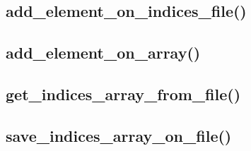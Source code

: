 \documentclass[12pt, a4paper]{article}
\begin{document}
\subsection{add\_element\_on\_indices\_file()}







\subsection{add\_element\_on\_array()}







\subsection{get\_indices\_array\_from\_file()}







\subsection{save\_indices\_array\_on\_file()}




\end{document}
